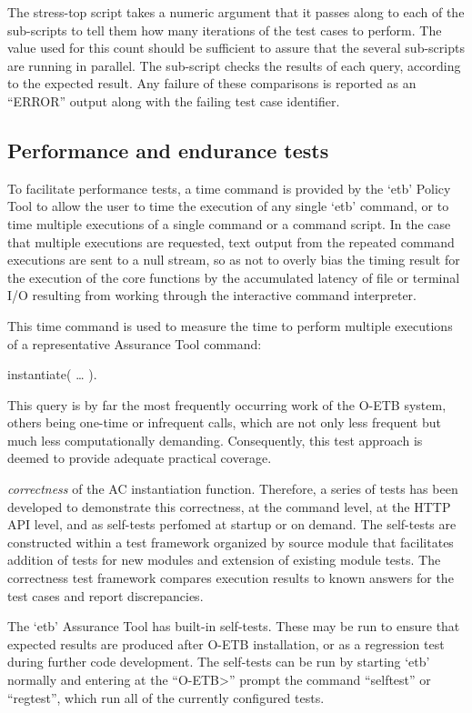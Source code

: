 \documentclass[12pt,twoside,a4paper]{article}
\begin{document}
The stress-top script takes a numeric argument that it passes along to each of the sub-scripts to tell them how many iterations of the test cases to perform. The value used for this count should be sufficient to assure that the several sub-scripts are running in parallel. The sub-script checks the results of each query, according to the expected result. Any failure of these comparisons is reported as an ``ERROR'' output along with the failing test case identifier.

\hypertarget{performance-and-endurance-tests}{%
\subsection{Performance and endurance tests}\label{performance-and-endurance-tests}}

To facilitate performance tests, a time command is provided by the `etb' Policy Tool to allow the user to time the execution of any single `etb' command, or to time multiple executions of a single command or a command script. In the case that multiple executions are requested, text output from the repeated command executions are sent to a null stream, so as not to overly bias the timing result for the execution of the core functions by the accumulated latency of file or terminal I/O resulting from working through the interactive command interpreter.

This time command is used to measure the time to perform multiple executions of a representative Assurance Tool command:

instantiate( \ldots{} ).

This query is by far the most frequently occurring work of the O-ETB system, others being one-time or infrequent calls, which are not only less frequent but much less computationally demanding. Consequently, this test approach is deemed to provide adequate practical coverage.

\emph{correctness} of the AC instantiation function. Therefore, a series of tests has been developed to demonstrate this correctness, at the command level, at the HTTP API level, and as self-tests perfomed at startup or on demand. The self-tests are constructed within a test framework organized by source module that facilitates addition of tests for new modules and extension of existing module tests. The correctness test framework compares execution results to known answers for the test cases and report discrepancies.

The `etb' Assurance Tool has built-in self-tests. These may be run to ensure that expected results are produced after O-ETB installation, or as a regression test during further code development. The self-tests can be run by starting `etb' normally and entering at the ``O-ETB\textgreater'' prompt the command ``selftest'' or ``regtest'', which run all of the currently configured tests.
\end{document}

